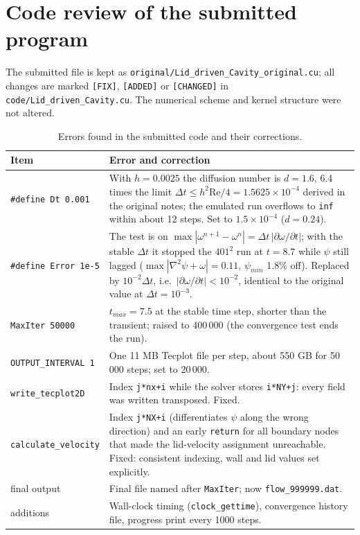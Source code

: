 \section{Code review of the submitted program}\label{sec:review}
The submitted file is kept as \texttt{original/Lid\_driven\_Cavity\_original.cu}; all changes are marked \texttt{[FIX]}, \texttt{[ADDED]} or \texttt{[CHANGED]} in \texttt{code/Lid\_driven\_Cavity.cu}. The numerical scheme and kernel structure were not altered.
\begin{table}[H]\centering\small
\begin{tabular}{p{3.6cm}p{11.6cm}}\toprule
Item & Error and correction\\\midrule
\texttt{\#define Dt 0.001} & With $h=0.0025$ the diffusion number is $d=1.6$, 6.4 times the limit $\Delta t\le h^2\mathrm{Re}/4=1.5625\times10^{-4}$ derived in the original notes; the emulated run overflows to \texttt{inf} within about 12 steps. Set to $1.5\times10^{-4}$ ($d=0.24$).\\
\texttt{\#define Error 1e-5} & The test is on $\max|\omega^{n+1}-\omega^n|=\Delta t\,|\partial\omega/\partial t|$; with the stable $\Delta t$ it stopped the $401^2$ run at $t=8.7$ while $\psi$ still lagged ($\max|\nabla^2\psi+\omega|=0.11$, $\psi_{min}$ 1.8\% off). Replaced by $10^{-2}\Delta t$, i.e.\ $|\partial\omega/\partial t|<10^{-2}$, identical to the original value at $\Delta t=10^{-3}$.\\
\texttt{MaxIter 50000} & $t_{max}=7.5$ at the stable time step, shorter than the transient; raised to 400\,000 (the convergence test ends the run).\\
\texttt{OUTPUT\_INTERVAL 1} & One 11 MB Tecplot file per step, about 550 GB for 50\,000 steps; set to 20\,000.\\
\texttt{write\_tecplot2D} & Index \texttt{j*nx+i} while the solver stores \texttt{i*NY+j}: every field was written transposed. Fixed.\\
\texttt{calculate\_velocity} & Index \texttt{j*NX+i} (differentiates $\psi$ along the wrong direction) and an early \texttt{return} for all boundary nodes that made the lid-velocity assignment unreachable. Fixed: consistent indexing, wall and lid values set explicitly.\\
final output & Final file named after \texttt{MaxIter}; now \texttt{flow\_999999.dat}.\\
additions & Wall-clock timing (\texttt{clock\_gettime}), convergence history file, progress print every 1000 steps.\\\bottomrule
\end{tabular}\caption{Errors found in the submitted code and their corrections.}\end{table}

